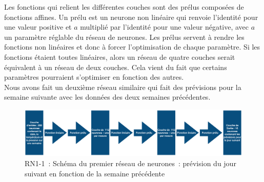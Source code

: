 \documentclass[11pt,a4paper]{article}
\begin{document}
Les fonctions qui relient les différentes couches sont des prélus composées de fonctions affines. Un prélu est un neurone non linéaire qui renvoie l'identité pour une valeur positive et $a$ multiplié par l'identité pour une valeur négative, avec $a$ un paramètre réglable du réseau de neurones. Les prélus servent à rendre les fonctions non linéaires et donc à forcer l'optimisation de chaque paramètre. Si les fonctions étaient toutes linéaires, alors un réseau de quatre couches serait équivalent à un réseau de deux couches. Cela vient du fait que certains paramètres pourraient s'optimiser en fonction des autres.\\

Nous avons fait un deuxième réseau similaire qui fait des prévisions pour la semaine suivante avec les données des deux semaines précédentes.\\

\begin{figure} [H]
\centering
\includegraphics[width=1 \textwidth]{./imagesTIPE/schemaRN.png}
\caption{\label{fig:schemaRN} RN1-1~: Schéma du premier réseau de neurones~: prévision du jour suivant en fonction de la semaine précédente}
\end{figure}
\end{document}

